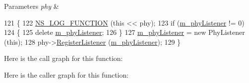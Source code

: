 \begin{DoxyParams}{Parameters}
{\em phy} & \\
\hline
\end{DoxyParams}

\begin{DoxyCode}
121 \{
122   \hyperlink{log-macros-disabled_8h_a90b90d5bad1f39cb1b64923ea94c0761}{NS\_LOG\_FUNCTION} (\textcolor{keyword}{this} << phy);
123   \textcolor{keywordflow}{if} (\hyperlink{classns3_1_1DcfManager_add2abc731be7ed1df730ba83bd6800ef}{m\_phyListener} != 0)
124     \{
125       \textcolor{keyword}{delete} \hyperlink{classns3_1_1DcfManager_add2abc731be7ed1df730ba83bd6800ef}{m\_phyListener};
126     \}
127   \hyperlink{classns3_1_1DcfManager_add2abc731be7ed1df730ba83bd6800ef}{m\_phyListener} = \textcolor{keyword}{new} PhyListener (\textcolor{keyword}{this});
128   phy->\hyperlink{classns3_1_1WifiPhy_accee79baeb6d9dbf80cf5711d81fc035}{RegisterListener} (\hyperlink{classns3_1_1DcfManager_add2abc731be7ed1df730ba83bd6800ef}{m\_phyListener});
129 \}
\end{DoxyCode}


Here is the call graph for this function\+:




Here is the caller graph for this function\+:


